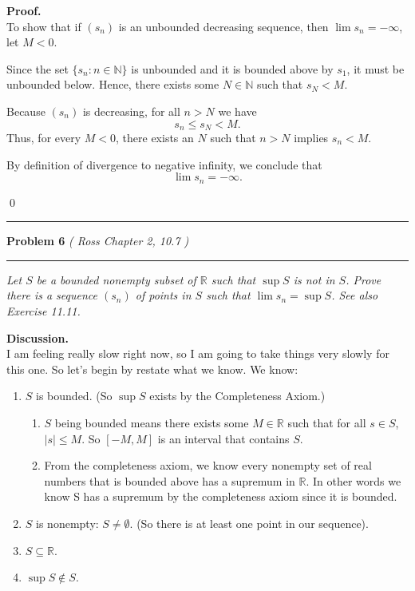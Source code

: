 \documentclass[12pt]{article}
\newcommand{\problem}[2][]{%
  \vspace{0.5em}
  \hrule\vspace{0.4em}
  \textbf{Problem #2}\if\relax\detokenize{#1}\relax\else\; \textit{(#1)}\fi
  \vspace{0.25em}\hrule\vspace{0.8em}
}
\begin{document}
\vspace{0.25em}

\textbf{Proof.}\\
To show that if $(s_n)$ is an unbounded decreasing sequence, then $\lim s_n = -\infty$, let $M < 0$.

Since the set $\{s_n : n \in \mathbb{N}\}$ is unbounded and it is bounded above by $s_1$, it must be unbounded below. Hence, there exists some $N \in \mathbb{N}$ such that $s_N < M$.

Because $(s_n)$ is decreasing, for all $n > N$ we have
\[
s_n \leq s_N < M.
\]
Thus, for every $M < 0$, there exists an $N$ such that $n > N$ implies $s_n < M$.

By definition of divergence to negative infinity, we conclude that
\[
\lim s_n = -\infty.
\]

\qed

\problem[ Ross Chapter 2, 10.7 ]{6}
\textit{Let $S$ be a bounded nonempty subset of $\mathbb{R}$ such that $\sup S$ is not in $S$. Prove there is a sequence $(s_n)$ of points in $S$ such that $\lim s_n = \sup S$. See also Exercise 11.11.}

\vspace{0.75em}

\textbf{Discussion.} \\
I am feeling really slow right now, so I am going to take things very slowly for this one. So let's begin by restate what we know. We know:

    \begin{enumerate}[label=(\arabic*)]
        \item $S$ is bounded. (So $\sup S$ exists by the Completeness Axiom.)
            \begin{enumerate}
                \item $S$ being bounded means there exists some $M \in \mathbb{R}$ such that for all $s \in S$, $|s| \leq M$. So $[-M, M]$ is an interval that contains $S$.
                \item From the completeness axiom, we know every nonempty set of real numbers that is bounded above has a supremum in $\mathbb{R}$. In other words we know S has a supremum by the completeness axiom since it is bounded.
            \end{enumerate}
        \item $S$ is nonempty: $S \neq \emptyset$. (So there is at least one point in our sequence).
        \item $S \subseteq \mathbb{R}$.
        \item $\sup S \notin S$.
    \end{enumerate}
\end{document}
